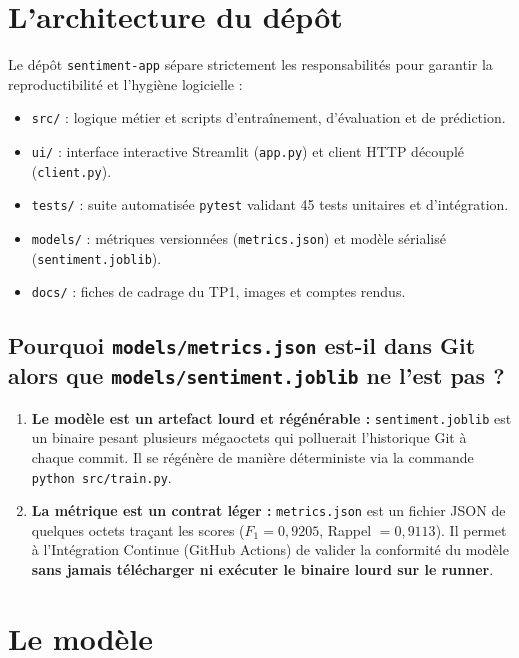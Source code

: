 \documentclass[11pt,a4paper]{article}
\begin{document}
\section{L'architecture du dépôt}

Le dépôt \texttt{sentiment-app} sépare strictement les responsabilités pour garantir la reproductibilité et l'hygiène logicielle :
\begin{itemize}
    \item \texttt{src/} : logique métier et scripts d'entraînement, d'évaluation et de prédiction.
    \item \texttt{ui/} : interface interactive Streamlit (\texttt{app.py}) et client HTTP découplé (\texttt{client.py}).
    \item \texttt{tests/} : suite automatisée \texttt{pytest} validant 45 tests unitaires et d'intégration.
    \item \texttt{models/} : métriques versionnées (\texttt{metrics.json}) et modèle sérialisé (\texttt{sentiment.joblib}).
    \item \texttt{docs/} : fiches de cadrage du TP1, images et comptes rendus.
\end{itemize}

\subsection*{Pourquoi \texttt{models/metrics.json} est-il dans Git alors que \texttt{models/sentiment.joblib} ne l'est pas ?}
\begin{enumerate}
    \item \textbf{Le modèle est un artefact lourd et régénérable :} \texttt{sentiment.joblib} est un binaire pesant plusieurs mégaoctets qui polluerait l'historique Git à chaque commit. Il se régénère de manière déterministe via la commande \texttt{python src/train.py}.
    \item \textbf{La métrique est un contrat léger :} \texttt{metrics.json} est un fichier JSON de quelques octets traçant les scores ($F_1 = 0{,}9205$, Rappel $= 0{,}9113$). Il permet à l'Intégration Continue (GitHub Actions) de valider la conformité du modèle \textbf{sans jamais télécharger ni exécuter le binaire lourd sur le runner}.
\end{enumerate}

\section{Le modèle}
\end{document}
